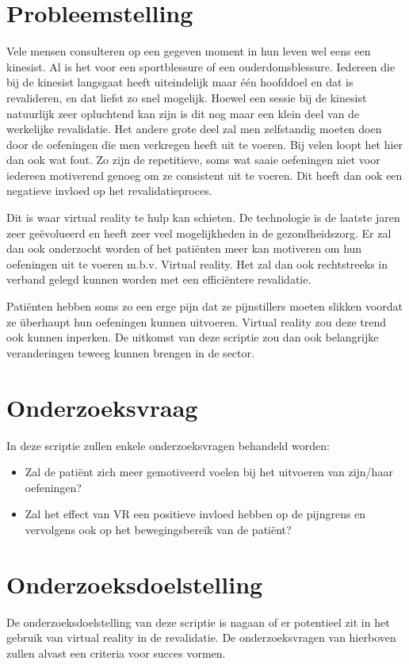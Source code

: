 \section{Probleemstelling}
\label{sec:probleemstelling}
Vele mensen consulteren op een gegeven moment in hun leven wel eens een kinesist. Al is het voor een sportblessure of een ouderdomsblessure. Iedereen die bij de kinesist langsgaat heeft uiteindelijk maar één hoofddoel en dat is revalideren, en dat liefst zo snel mogelijk. Hoewel een sessie bij de kinesist natuurlijk zeer opluchtend kan zijn is dit nog maar een klein deel van de werkelijke revalidatie.  Het andere grote deel zal men zelfstandig moeten doen door de oefeningen die men verkregen heeft uit te voeren. Bij velen loopt het hier dan ook wat fout. Zo zijn de repetitieve, soms wat saaie oefeningen niet voor iedereen motiverend genoeg om ze consistent uit te voeren. Dit heeft dan ook een negatieve invloed op het revalidatieproces.

Dit is waar virtual reality te hulp kan schieten. De technologie is de laatste jaren zeer geëvolueerd en heeft zeer veel mogelijkheden in de gezondheidszorg. Er zal dan ook onderzocht worden of het patiënten meer kan motiveren om hun oefeningen uit te voeren m.b.v. Virtual reality. Het zal dan ook rechtstreeks in verband gelegd kunnen worden met een efficiëntere revalidatie. 

Patiënten hebben soms zo een erge pijn dat ze pijnstillers moeten slikken voordat ze überhaupt hun oefeningen kunnen uitvoeren. Virtual reality zou deze trend ook kunnen inperken. De uitkomst van deze scriptie zou dan ook belangrijke veranderingen teweeg kunnen brengen in de sector.


\section{Onderzoeksvraag}
\label{sec:onderzoeksvraag}

In deze scriptie zullen enkele onderzoeksvragen behandeld worden:
\begin{itemize}
	\item Zal de patiënt zich meer gemotiveerd voelen bij het uitvoeren van zijn/haar oefeningen?
	\newline
	\item Zal het effect van VR een positieve invloed hebben op de pijngrens en vervolgens ook op het bewegingsbereik van de patiënt?
\end{itemize}

\section{Onderzoeksdoelstelling}
\label{sec:onderzoeksdoelstelling}
De onderzoeksdoelstelling van deze scriptie is nagaan of er potentieel zit in het gebruik van virtual reality in de revalidatie. De onderzoeksvragen van hierboven zullen alvast een criteria voor succes vormen.


